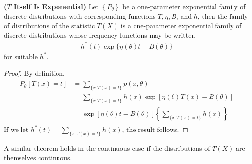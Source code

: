 \documentclass{article}
\newcommand{\bfs}[1]{\textbf{({#1}) }}
\begin{document}
\begin{thma}\bfs{$T$ Itself Is Exponential}
 Let $\left\{P_{\theta}\right\}$ be a one-parameter exponential family of discrete distributions with corresponding functions $T, \eta, B$, and $h$, then the family of distributions of the statistic $T(X)$ is a one-parameter exponential family of discrete distributions whose frequency
functions may be written
\begin{align*}
h^{*}(t) \exp \{\eta(\theta) t-B(\theta)\}
\end{align*}
for suitable $h^{*}$.
\end{thma}
\begin{proof}
By definition,
\begin{align*}
\begin{aligned}
P_{\theta}[T(x)=t] &=\sum_{\{x: T(x)=t\}} p(x, \theta) \\
&=\sum_{\{x: T(x)=t\}} h(x) \exp [\eta(\theta) T(x)-B(\theta)] \\
&=\exp [\eta(\theta) t-B(\theta)]\left\{\sum_{\{x: T(x)=t\}} h(x)\right\}
\end{aligned}
\end{align*}
If we let $h^{*}(t)=\sum_{\{x: T(x)=t\}} h(x)$, the result follows.
\end{proof} 
A similar theorem holds in the continuous case if the distributions of $T(X)$ are themselves continuous.
\end{document}
